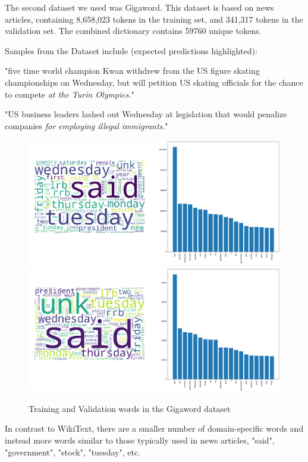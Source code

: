 \documentclass[a4paper]{article}
\begin{document}
The second dataset we used was Gigaword. This dataset is based on news articles,
containing 8,658,023 tokens in the training set, and 341,317 tokens in the
validation set. The combined dictionary contains 59760 unique tokens.

Samples from the Dataset include (expected predictions highlighted):

"five time world champion Kwan withdrew from the US figure skating championships
on Wednesday, but will petition US skating officials for the chance to compete
\emph{at the Turin Olympics}."

"US business leaders lashed out Wednesday at legislation that would penalize companies
\emph{for employing illegal immigrants}."

\begin{figure}[!ht]
\includegraphics[width=0.8\columnwidth]{sr-eda-gigaword-train-words}
\includegraphics[width=0.8\columnwidth]{sr-eda-gigaword-valid-words}
\centering
\caption{Training and Validation words in the Gigaword dataset}
\end{figure}

In contrast to WikiText, there are a smaller number of domain-specific
words and instead more words similar to those typically used in news
articles, "said", "government", "stock", "tuesday", etc.
\end{document}

